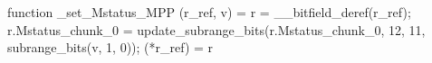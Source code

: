 function _set_Mstatus_MPP (r_ref, v) = {
    r = __bitfield_deref(r_ref);
    r.Mstatus_chunk_0 = update_subrange_bits(r.Mstatus_chunk_0, 12, 11, subrange_bits(v, 1, 0));
    (*r_ref) = r
}
